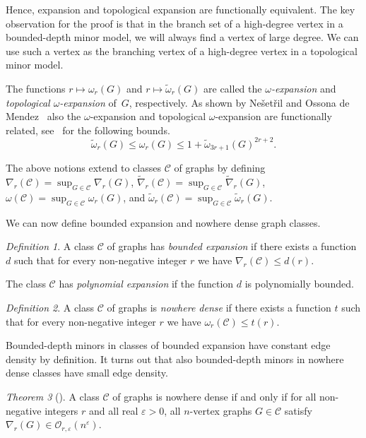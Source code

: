 \documentclass[1p,number,a4paper]{elsarticle}
\theoremstyle{remark}
\newcommand{\Oof}{\mathcal{O}}
\newcommand{\CCC}{\mathscr{C}}
\newcommand{\Cc}{\mathscr{C}}
\renewcommand{\epsilon}{\varepsilon}
\newtheorem{theorem}{Theorem}[section]
\newtheorem{definition}[theorem]{Definition}
\begin{document}
Hence, expansion and topological expansion are functionally equivalent. 
The key observation for the proof is that in the branch set of a high-degree vertex in a bounded-depth minor model, we will always find a vertex of large degree. We can use such a vertex as the branching vertex of a high-degree vertex in a topological minor model.

The functions 
$r \mapsto \omega_r(G)$ and $r \mapsto \widetilde\omega_r(G)$ 
are called the \emph{$\omega$-expansion} and \emph{topological \mbox{$\omega$-expansion}} of~$G$, respectively. 
As shown by Ne\v{s}et\v{r}il and Ossona de Mendez~\cite{nevsetvril2011nowhere} also the $\omega$-expansion and topological \mbox{$\omega$-expansion} are functionally related, see~\cite{notes} for the following bounds. 
\[\widetilde{\omega}_r(G)\leq \omega_r(G)\leq 1+\widetilde{\omega}_{3r+1}(G)^{2r+2}.\]

The above notions  extend to classes $\Cc$ of graphs
by defining $\nabla_r(\Cc)=\sup_{G\in\Cc}\nabla_r(G)$, 
$\widetilde{\nabla}_r(\Cc)=\sup_{G\in\Cc}\widetilde\nabla_r(G)$, 
$\omega(\Cc)=\sup_{G\in\Cc}\omega_r(G)$, and
$\widetilde{\omega}_r(\Cc)=\sup_{G\in\Cc}\widetilde\omega_r(G)$.

\smallskip
We can now define bounded expansion and nowhere dense graph classes.

\begin{definition}
 A class $\Cc$ of graphs has
\emph{bounded expansion} if there exists a function $d$ such 
that for every non-negative integer $r$ we have $\nabla_r(\Cc)\leq d(r)$. 
\end{definition}

The class $\Cc$ has \emph{polynomial expansion} if the function $d$ is polynomially bounded.  

\begin{definition}
A class $\Cc$ of graphs is \emph{nowhere dense} if there exists
a function $t$ such that for every non-negative integer $r$ we have 
$\omega_r(\Cc)\leq t(r)$. 
\end{definition}

Bounded-depth minors in classes of bounded expansion have constant edge density by
definition. It turns out that also bounded-depth minors in nowhere dense classes have small edge density. 

\begin{theorem}[\cite{nevsetvril2011nowhere}]
A class 
$\Cc$ of graphs is nowhere dense if and only 
if for all non-negative integers $r$ and all real
$\epsilon>0$, all
$n$-vertex graphs $G\in\CCC$ satisfy
$\nabla_r(G)\in \Oof_{r,\epsilon}(n^\epsilon)$.  
\end{theorem}
\end{document}
